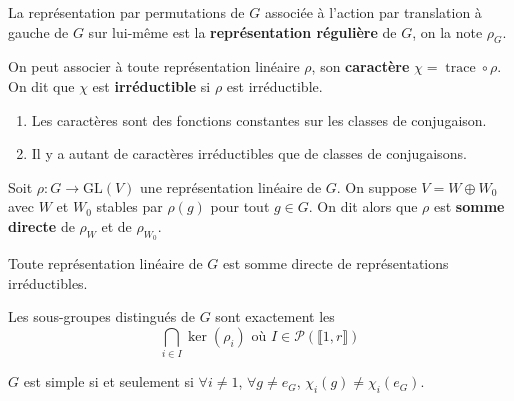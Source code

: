   \begin{definition}
    La représentation par permutations de $G$ associée à l'action par translation à gauche de $G$ sur lui-même est la \textbf{représentation régulière} de $G$, on la note $\rho_G$.
  \end{definition}


  \begin{definition}
    On peut associer à toute représentation linéaire $\rho$, son \textbf{caractère} $\chi = \operatorname{trace} \circ \rho$. On dit que $\chi$ est \textbf{irréductible} si $\rho$ est irréductible.
  \end{definition}

  \begin{proposition}
    \begin{enumerate}[label=(\roman*)]
      \item Les caractères sont des fonctions constantes sur les classes de conjugaison.
      \item Il y a autant de caractères irréductibles que de classes de conjugaisons.
    \end{enumerate}
  \end{proposition}

  \begin{definition}
    Soit $\rho : G \rightarrow \mathrm{GL}(V)$ une représentation linéaire de $G$. On suppose $V = W \oplus W_0$ avec $W$ et $W_0$ stables par $\rho(g)$ pour tout $g \in G$. On dit alors que $\rho$ est \textbf{somme directe} de $\rho_W$ et de $\rho_{W_0}$.
  \end{definition}

  \begin{theorem}[Maschke]
    Toute représentation linéaire de $G$ est somme directe de représentations irréductibles.
  \end{theorem}


  \begin{theorem}
    Les sous-groupes distingués de $G$ sont exactement les
    \[ \bigcap_{i \in I} \ker(\rho_i) \text{ où } I \in \mathcal{P}(\llbracket 1, r \rrbracket) \]
  \end{theorem}

  \begin{corollary}
    $G$ est simple si et seulement si $\forall i \neq 1$, $\forall g \neq e_G$, $\chi_i(g) \neq \chi_i(e_G)$.
  \end{corollary}

